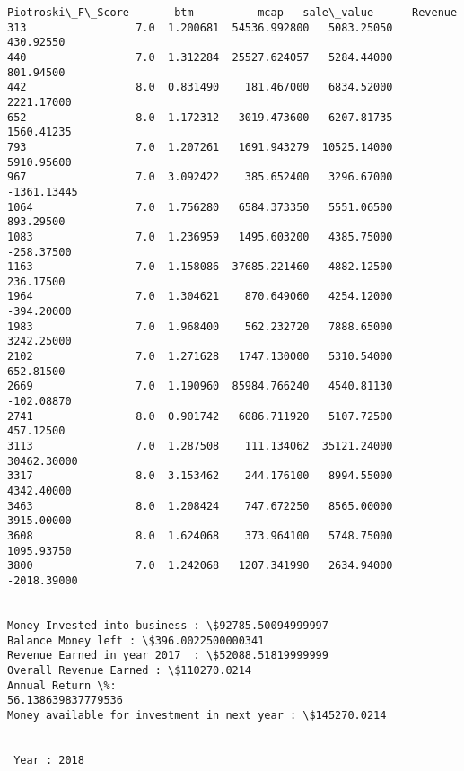 \documentclass[11pt]{article}
\begin{document}
\begin{Verbatim}[commandchars=\\\{\}]
      Piotroski\_F\_Score       btm          mcap   sale\_value      Revenue
313                 7.0  1.200681  54536.992800   5083.25050    430.92550
440                 7.0  1.312284  25527.624057   5284.44000    801.94500
442                 8.0  0.831490    181.467000   6834.52000   2221.17000
652                 8.0  1.172312   3019.473600   6207.81735   1560.41235
793                 7.0  1.207261   1691.943279  10525.14000   5910.95600
967                 7.0  3.092422    385.652400   3296.67000  -1361.13445
1064                7.0  1.756280   6584.373350   5551.06500    893.29500
1083                7.0  1.236959   1495.603200   4385.75000   -258.37500
1163                7.0  1.158086  37685.221460   4882.12500    236.17500
1964                7.0  1.304621    870.649060   4254.12000   -394.20000
1983                7.0  1.968400    562.232720   7888.65000   3242.25000
2102                7.0  1.271628   1747.130000   5310.54000    652.81500
2669                7.0  1.190960  85984.766240   4540.81130   -102.08870
2741                8.0  0.901742   6086.711920   5107.72500    457.12500
3113                7.0  1.287508    111.134062  35121.24000  30462.30000
3317                8.0  3.153462    244.176100   8994.55000   4342.40000
3463                8.0  1.208424    747.672250   8565.00000   3915.00000
3608                8.0  1.624068    373.964100   5748.75000   1095.93750
3800                7.0  1.242068   1207.341990   2634.94000  -2018.39000


Money Invested into business : \$92785.50094999997
Balance Money left : \$396.0022500000341
Revenue Earned in year 2017  : \$52088.51819999999
Overall Revenue Earned : \$110270.0214
Annual Return \%:
56.138639837779536
Money available for investment in next year : \$145270.0214


 Year : 2018


\end{Verbatim}
\end{document}
